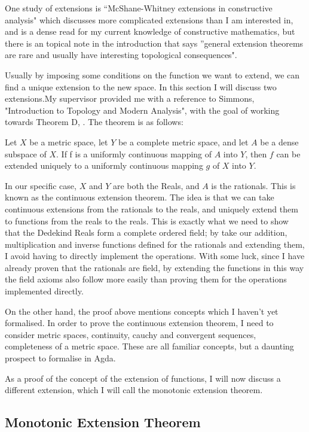\documentclass[ProjectReport]{subfiles}
\begin{document}

One study of extensions is ``McShane-Whitney extensions in constructive analysis" \cite{petrakis2020mcshane} which discusses more complicated extensions than I am interested in, and is a dense read for my current knowledge of constructive mathematics, but there is an topical note in the introduction that says ''general extension theorems are rare and usually have interesting topological consequences". 

Usually by imposing some conditions on the function we want to extend, we can find a unique extension to the new space. In this section I will discuss two extensions.My supervisor provided me with a reference to Simmons, "Introduction to Topology and Modern Analysis", with the goal of working towards Theorem D, \cite[Page 78]{simmons1983introduction}. The theorem is as follows:

Let $X$ be a metric space, let $Y$ be a complete metric space, and let $A$ be a dense subspace of $X$. If f is a uniformly continuous mapping of $A$ into $Y$, then $f$ can be extended uniquely to a uniformly continuous mapping $g$ of $X$ into $Y$.

In our specific case, $X$ and $Y$ are both the Reals, and $A$ is the rationals. This is known as the continuous extension theorem. The idea is that we can take continuous extensions from the rationals to the reals, and uniquely extend them to functions from the reals to the reals. This is exactly what we need to show that the Dedekind Reals form a complete ordered field; by take our addition, multiplication and inverse functions defined for the rationals and extending them, I avoid having to directly implement the operations. With some luck, since I have already proven that the rationals are field, by extending the functions in this way the field axioms also follow more easily than proving them for the operations implemented directly.

On the other hand, the proof above mentions concepts which I haven't yet formalised. In order to prove the continuous extension theorem, I need to consider metric spaces, continuity, cauchy and convergent sequences, completeness of a metric space. These are all familiar concepts, but a daunting prospect to formalise in Agda. 

As a proof of the concept of the extension of functions, I will now discuss a different extension, which I will call the monotonic extension theorem. 

\subsection{Monotonic Extension Theorem}
\end{document}
